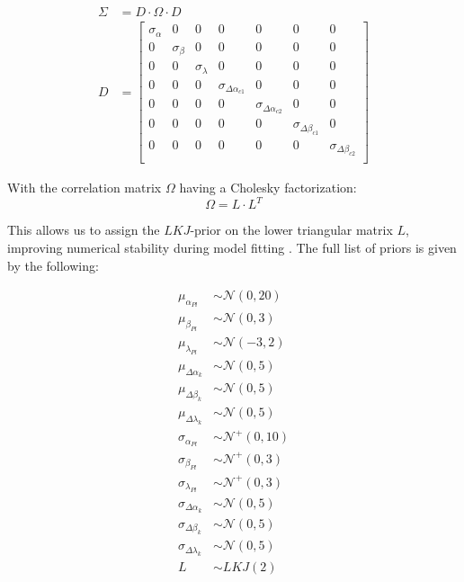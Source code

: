 \documentclass{article}
\begin{document}
\begin{align*}
  \Sigma &= D \cdot \Omega \cdot D   \\
  D &= \begin{bmatrix}
\sigma_{\alpha} & 0 & 0 & 0 & 0 & 0 &0\\
0 & \sigma_{\beta} & 0 & 0 & 0 & 0 & 0\\
0 & 0 & \sigma_{\lambda} &  0 & 0 & 0 & 0\\
0 & 0 & 0 & \sigma_{\Delta\alpha_{c1}} & 0 & 0 &0\\
0 & 0 & 0 & 0 & \sigma_{\Delta\alpha_{c2}} & 0 &0\\
0 & 0 & 0 & 0 & 0 & \sigma_{\Delta\beta_{c1}} &0\\
0 & 0 & 0 & 0 & 0 & 0 & \sigma_{\Delta\beta_{c2}}\\
\end{bmatrix}
\end{align*}

With the correlation matrix $\Omega$ having a Cholesky factorization:
\[
\Omega = L \cdot L^T
\]

This allows us to assign the $LKJ$-prior on the lower triangular matrix $L$, improving numerical stability during model fitting \parencite{lewandowski2009lkj}. The full list of priors is given by the following:

\begin{align*} 
\mu_{\alpha_{Pl}} &\sim \mathcal{N}\left(0,20\right) \\
\mu_{\beta_{Pl}}  &\sim \mathcal{N} \left(0,3\right) \\
\mu_{\lambda_{Pl}}&\sim \mathcal{N} \left(-3,2\right) \\
\mu_{\Delta\alpha_{k}} &\sim \mathcal{N} \left(0,5\right) \\ 
\mu_{\Delta\beta_{k}} &\sim \mathcal{N} \left(0,5\right)\\ 
\mu_{\Delta\lambda_{k}} &\sim \mathcal{N} \left(0,5\right)\\ 
\sigma_{\alpha_{Pl}} &\sim \mathcal{N}^+ \left(0,10\right) \\
\sigma_{\beta_{Pl}} &\sim \mathcal{N}^+\left(0,3\right) \\
\sigma_{\lambda_{Pl}}&\sim\mathcal{N}^+\left(0,3\right) \\
\sigma_{\Delta\alpha_{k}} &\sim \mathcal{N} \left(0,5\right) \\ 
\sigma_{\Delta\beta_{k}} &\sim \mathcal{N} \left(0,5\right)\\ 
\sigma_{\Delta\lambda_{k}} &\sim \mathcal{N} \left(0,5\right)\\ 
L &\sim LKJ \left(2\right)
\end{align*}
\end{document}
